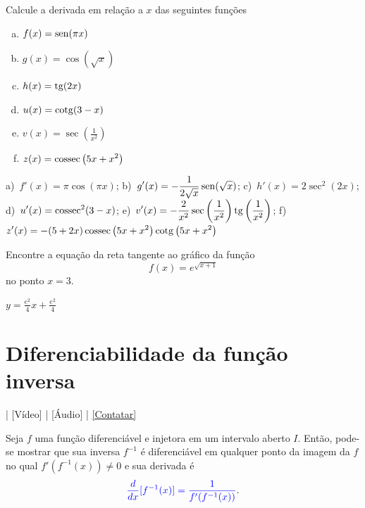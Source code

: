 \begin{exer}
  Calcule a derivada em relação a $x$ das seguintes funções
  \begin{enumerate}[a)]
  \item $\displaystyle f(x) = \operatorname{sen}(\pi x)$
  \item $\displaystyle g(x) = \cos(\sqrt{x})$
  \item $\displaystyle h(x) = \operatorname{tg}(2x)$
  \item $\displaystyle u(x) = \operatorname{cotg}(3 - x)$
  \item $\displaystyle v(x) = \sec\left(\frac{1}{x^2}\right)$
  \item $\displaystyle z(x) = \operatorname{cossec}\left(5x + x^2\right)$
  \end{enumerate}
\end{exer}
\begin{resp}
  a)~$\displaystyle f'(x) = \pi\cos(\pi x)$; b)~$\displaystyle g'(x) = -\frac{1}{2\sqrt{x}}\operatorname{sen}(\sqrt{x})$; c)~$\displaystyle h'(x) = 2\sec^2(2x)$; d)~$\displaystyle u'(x) = \operatorname{cossec}^2(3-x)$; e)~$\displaystyle v'(x) = -\frac{2}{x^2}\sec\left(\frac{1}{x^2}\right)\operatorname{tg}\left(\frac{1}{x^2}\right)$; f)~$\displaystyle z'(x) = -(5+2x)\operatorname{cossec}\left(5x + x^2\right)\operatorname{cotg}\left(5x + x^2\right)$
\end{resp}

\begin{exer}
  Encontre a equação da reta tangente ao gráfico da função
  \begin{equation}
    f(x) = e^{\sqrt{x+1}}
  \end{equation}
  no ponto $x=3$.
\end{exer}
\begin{resp}
  $y = \frac{e^2}{4}x + \frac{e^2}{4}$
\end{resp}

\section{Diferenciabilidade da função inversa}\label{cap_deriv_sec_funinv}

\begin{flushright}
  [YouTube] | [Vídeo] | [Áudio] | \href{https://phkonzen.github.io/notas/contato.html}{[Contatar]}
\end{flushright}

Seja $f$ uma função diferenciável e injetora em um intervalo aberto $I$. Então, pode-se mostrar que sua inversa $f^{-1}$ é diferenciável em qualquer ponto da imagem da $f$ no qual $f'(f^{-1}(x))\neq 0$ e sua derivada é
\begin{equation}\label{eq:diff_funinv}
  {\color{blue}\frac{d}{dx}[f^{-1}(x)] = \frac{1}{f'(f^{-1}(x))}}.
\end{equation}

